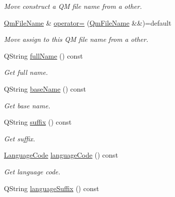 \begin{DoxyCompactItemize}
\begin{DoxyCompactList}\small\item\em Move construct a QM file name from a other. \end{DoxyCompactList}\item 
\hyperlink{class_mdt_1_1_translation_1_1_qm_file_name}{Qm\+File\+Name} \& \hyperlink{class_mdt_1_1_translation_1_1_qm_file_name_a48c38b3c2cc4a616c66292739d055b8a}{operator=} (\hyperlink{class_mdt_1_1_translation_1_1_qm_file_name}{Qm\+File\+Name} \&\&)=default\hypertarget{class_mdt_1_1_translation_1_1_qm_file_name_a48c38b3c2cc4a616c66292739d055b8a}{}\label{class_mdt_1_1_translation_1_1_qm_file_name_a48c38b3c2cc4a616c66292739d055b8a}

\begin{DoxyCompactList}\small\item\em Move assign to this QM file name from a other. \end{DoxyCompactList}\item 
Q\+String \hyperlink{class_mdt_1_1_translation_1_1_qm_file_name_afdd50f953fe8a694aa1e7a5b87b4903e}{full\+Name} () const 
\begin{DoxyCompactList}\small\item\em Get full name. \end{DoxyCompactList}\item 
Q\+String \hyperlink{class_mdt_1_1_translation_1_1_qm_file_name_ab597e4e1a8f4e5c7e1d584ff8be05fe3}{base\+Name} () const 
\begin{DoxyCompactList}\small\item\em Get base name. \end{DoxyCompactList}\item 
Q\+String \hyperlink{class_mdt_1_1_translation_1_1_qm_file_name_ae7a002b2ad54c71e6d72e001705f9a7f}{suffix} () const 
\begin{DoxyCompactList}\small\item\em Get suffix. \end{DoxyCompactList}\item 
\hyperlink{class_mdt_1_1_translation_1_1_language_code}{Language\+Code} \hyperlink{class_mdt_1_1_translation_1_1_qm_file_name_a4a30158ca25d82fc5108e9ee68116a20}{language\+Code} () const 
\begin{DoxyCompactList}\small\item\em Get language code. \end{DoxyCompactList}\item 
Q\+String \hyperlink{class_mdt_1_1_translation_1_1_qm_file_name_ae1f085e401c2b8395c3f91b0312c3b3c}{language\+Suffix} () const 

\end{DoxyCompactItemize}
